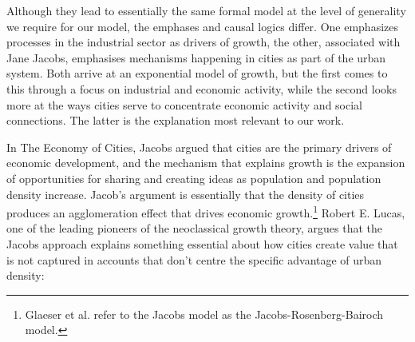 

Although they lead to essentially the same formal model at the level of generality we require for our model, %
the emphases and causal logics differ. One emphasizes processes in the industrial sector as drivers of growth, the other, associated with Jane Jacobs, emphasises mechanisms happening in cities as part of the urban system. %
Both arrive at an exponential model of growth, but the first comes to this through a focus on industrial and economic activity, while the second looks more at the ways cities serve to concentrate economic activity and social connections. The latter is the explanation most relevant to our work.

In The Economy of Cities, Jacobs \cite{jacobsEconomyCities1969} argued that %
cities are the primary drivers of economic development, and the mechanism that explains growth is the expansion of opportunities for sharing and creating ideas as population and population density increase. Jacob's argument is essentially that the density of cities produces an agglomeration effect that drives economic growth.\footnote{Glaeser et al. \cite{glaeserGrowthCities1991} refer to the Jacobs model as the Jacobs-Rosenberg-Bairoch \cite{bairochCitiesEconomicDevelopment1988, rosenbergTechnologicalChangeMachine1963} model.} %
Robert E. Lucas, one of the leading pioneers of the neoclassical growth theory, argues that the Jacobs approach explains something essential about how cities create value that is not captured in accounts that don't centre the specific advantage of urban density: %

